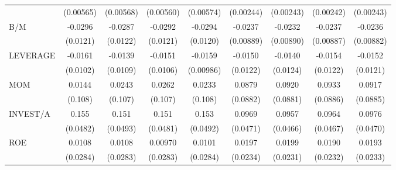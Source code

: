 \begin{table}[htbp]
\begin{tabular}{l*{8}{c}}
                    &   (0.00565)         &   (0.00568)         &   (0.00560)         &   (0.00574)         &   (0.00244)         &   (0.00243)         &   (0.00242)         &   (0.00243)         \\
B/M                 &     -0.0296\sym{**} &     -0.0287\sym{**} &     -0.0292\sym{**} &     -0.0294\sym{**} &     -0.0237\sym{***}&     -0.0232\sym{**} &     -0.0237\sym{***}&     -0.0236\sym{***}\\
                    &    (0.0121)         &    (0.0122)         &    (0.0121)         &    (0.0120)         &   (0.00889)         &   (0.00890)         &   (0.00887)         &   (0.00882)         \\
LEVERAGE            &     -0.0161         &     -0.0139         &     -0.0151         &     -0.0159         &     -0.0150         &     -0.0140         &     -0.0154         &     -0.0152         \\
                    &    (0.0102)         &    (0.0109)         &    (0.0106)         &   (0.00986)         &    (0.0122)         &    (0.0124)         &    (0.0122)         &    (0.0121)         \\
MOM                 &      0.0144         &      0.0243         &      0.0262         &      0.0233         &      0.0879         &      0.0920         &      0.0933         &      0.0917         \\
                    &     (0.108)         &     (0.107)         &     (0.107)         &     (0.108)         &    (0.0882)         &    (0.0881)         &    (0.0886)         &    (0.0885)         \\
INVEST/A            &       0.155\sym{***}&       0.151\sym{***}&       0.151\sym{***}&       0.153\sym{***}&      0.0969\sym{**} &      0.0957\sym{**} &      0.0964\sym{**} &      0.0976\sym{**} \\
                    &    (0.0482)         &    (0.0493)         &    (0.0481)         &    (0.0492)         &    (0.0471)         &    (0.0466)         &    (0.0467)         &    (0.0470)         \\
ROE                 &      0.0108         &      0.0108         &     0.00970         &      0.0101         &      0.0197         &      0.0199         &      0.0190         &      0.0193         \\
                    &    (0.0284)         &    (0.0283)         &    (0.0283)         &    (0.0284)         &    (0.0234)         &    (0.0231)         &    (0.0232)         &    (0.0233)         \\

\end{tabular}
\end{table}
